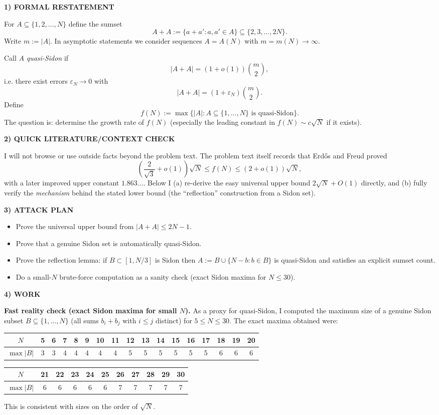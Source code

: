 \medskip
\noindent\textbf{1) FORMAL RESTATEMENT}

For $A\subseteq\{1,2,\dots,N\}$ define the sumset
\[
A+A:=\{a+a': a,a'\in A\} \subseteq \{2,3,\dots,2N\}.
\]
Write $m:=|A|$.  In asymptotic statements we consider sequences $A=A(N)$ with $m=m(N)\to\infty$.

Call $A$ \emph{quasi-Sidon} if
\[
|A+A| = (1+o(1))\binom{m}{2},
\]
i.e. there exist errors $\varepsilon_N\to 0$ with
\[
|A+A| = (1+\varepsilon_N)\binom{m}{2}.
\]
Define
\[
f(N):=\max\{|A|: A\subseteq\{1,\dots,N\}\text{ is quasi-Sidon}\}.
\]
The question is: determine the growth rate of $f(N)$ (especially the leading constant in $f(N)\sim c\sqrt N$ if it exists).

\medskip
\noindent\textbf{2) QUICK LITERATURE/CONTEXT CHECK}

I will not browse or use outside facts beyond the problem text.
The problem text itself records that Erd\H{o}s and Freud proved
\[
\left(\frac{2}{\sqrt{3}}+o(1)\right)\sqrt N \le f(N) \le (2+o(1))\sqrt N,
\]
with a later improved upper constant $1.863\dots$.
Below I (a) re-derive the easy universal upper bound $2\sqrt N+O(1)$ directly, and (b) fully verify the \emph{mechanism} behind the stated lower bound (the ``reflection'' construction from a Sidon set).

\medskip
\noindent\textbf{3) ATTACK PLAN}

\begin{itemize}
\item Prove the universal upper bound from $|A+A|\le 2N-1$.
\item Prove that a genuine Sidon set is automatically quasi-Sidon.
\item Prove the reflection lemma: if $B\subset[1,N/3]$ is Sidon then $A:=B\cup\{N-b:b\in B\}$ is quasi-Sidon and satisfies an explicit sumset count.
\item Do a small-$N$ brute-force computation as a sanity check (exact Sidon maxima for $N\le 30$).
\end{itemize}

\medskip
\noindent\textbf{4) WORK}

\textbf{Fast reality check (exact Sidon maxima for small $N$).}
As a proxy for quasi-Sidon, I computed the maximum size of a genuine Sidon subset $B\subseteq\{1,\dots,N\}$ (all sums $b_i+b_j$ with $i\le j$ distinct) for $5\le N\le 30$.
The exact maxima obtained were:
\begin{center}
\begin{tabular}{c|cccccccccccccccc}
$N$ &5&6&7&8&9&10&11&12&13&14&15&16&17&18&19&20\\\hline
$\max|B|$ &3&3&4&4&4&4&4&5&5&5&5&5&5&6&6&6
\end{tabular}
\end{center}
\begin{center}
\begin{tabular}{c|cccccccccc}
$N$ &21&22&23&24&25&26&27&28&29&30\\\hline
$\max|B|$ &6&6&6&6&6&7&7&7&7&7
\end{tabular}
\end{center}
This is consistent with sizes on the order of $\sqrt N$.

